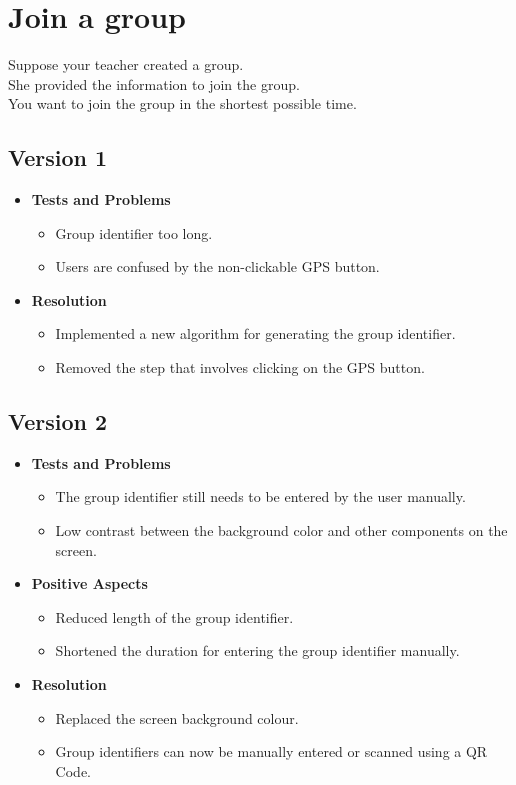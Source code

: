\documentclass[10pt,a4paper]{article}
\begin{document}
\newpage
\section*{Join a group}
Suppose your teacher created a group. \\
She provided the information to join the group. \\
You want to join the group in the shortest possible time.
\subsection*{Version 1}
\begin{itemize}
    \item \textbf{Tests and Problems}
    \begin{itemize}
        \item Group identifier too long.
        \item Users are confused by the non-clickable GPS button.
    \end{itemize}
    \item \textbf{Resolution}
    \begin{itemize}
        \item Implemented a new algorithm for generating the group identifier.
        \item Removed the step that involves clicking on the GPS button.                
    \end{itemize}
\end{itemize}

\subsection*{Version 2}
\begin{itemize}
    \item \textbf{Tests and Problems}
    \begin{itemize}
        \item The group identifier still needs to be entered by the user manually.        
        \item Low contrast between the background color and other components on the screen.
    \end{itemize}
    \item \textbf{Positive Aspects}
    \begin{itemize}
        \item Reduced length of the group identifier.
        \item Shortened the duration for entering the group identifier manually.
    \end{itemize}
    \item \textbf{Resolution}
    \begin{itemize}
        \item Replaced the screen background colour.
        \item Group identifiers can now be manually entered or scanned using a QR Code.
    \end{itemize}
\end{itemize}
\end{document}
